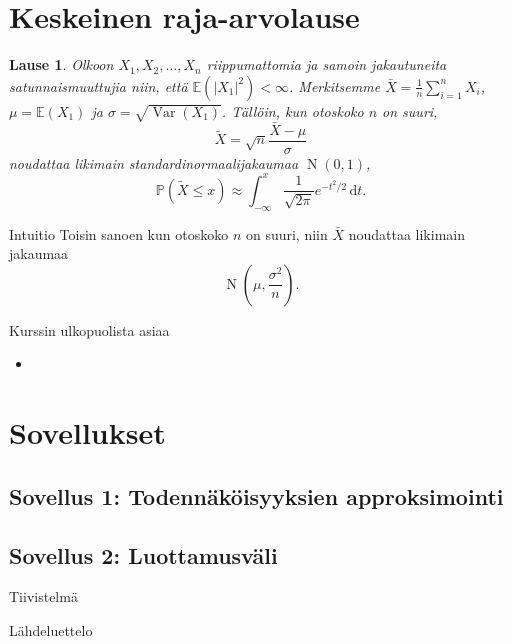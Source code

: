 \documentclass{beamer}
\newtheorem{teoreema}{Lause}
\DeclareMathOperator{\var}{Var}
\DeclareMathOperator{\n}{\mathrm N}
\begin{document}
\section{Keskeinen raja-arvolause}


\begin{frame}
  \begin{teoreema}
    Olkoon $X_1, X_2, \ldots, X_n$ riippumattomia ja samoin jakautuneita
    satunnaismuuttujia niin, että $\mathbb{E}\left(\left|X_1\right|^2\right) <
    \infty$. Merkitsemme $\bar X = \frac{1}{n}\sum_{i = 1}^n X_i$, $\mu =
    \mathbb{E}\left(X_1\right)$ ja $\sigma = \sqrt{\var\left(X_1\right)}$.
    Tällöin, kun otoskoko $n$ on suuri,
    \begin{equation*}
      \tilde X = \sqrt{n}\frac{\bar X - \mu}{\sigma}
    \end{equation*}
    noudattaa likimain standardinormaalijakaumaa $\n\left(0, 1\right)$,
    \pause
    \begin{equation*}
      \mathbb{P}\left(\tilde X \leq x\right) \approx
      \int_{-\infty}^x \frac{1}{\sqrt{2\pi}}e^{-t^2/2}\,\mathrm{d}t.
    \end{equation*}
  \end{teoreema}
\end{frame}



\begin{frame}{Intuitio}
  Toisin sanoen kun otoskoko $n$ on suuri, niin $\bar X$ noudattaa likimain
  jakaumaa
  \begin{equation*}
    \n\left(\mu, \frac{\sigma^2}{n}\right).
  \end{equation*}
\end{frame}


\begin{frame}{Kurssin ulkopuolista asiaa}
  \begin{itemize}
    \item 
  \end{itemize}
\end{frame}


\section{Sovellukset}

\subsection{Sovellus 1: Todennäköisyyksien approksimointi}

\subsection{Sovellus 2: Luottamusväli}

\begin{frame}{Tiivistelmä}
  
\end{frame}

\begin{frame}[allowframebreaks]{Lähdeluettelo}
  \printbibliography
\end{frame}
\end{document}
